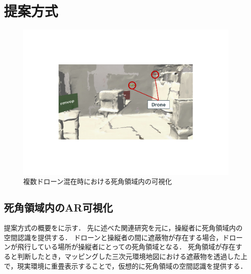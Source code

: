 \documentclass[a4paper,10pt,twocolumn,uplatex]{jsarticle}
\begin{document}
\section{提案方式}

\begin{figure}[!tb]
  \centering
  \includegraphics[width=0.9\linewidth]{img/03_propose.pdf}
  \caption{複数ドローン混在時における死角領域内の可視化}
  \label{fig:outline}
\end{figure}


\subsection{死角領域内のAR可視化}
提案方式の概要をに示す．
先に述べた関連研究\cite{Erat}を元に，操縦者に死角領域内の空間認識を提供する．
ドローンと操縦者の間に遮蔽物が存在する場合，ドローンが飛行している場所が操縦者にとっての死角領域となる．
死角領域が存在すると判断したとき，マッピングした三次元環境地図における遮蔽物を透過した上で，現実環境に重畳表示することで，仮想的に死角領域の空間認識を提供する．
\end{document}

